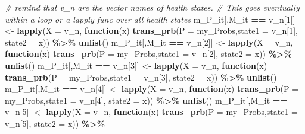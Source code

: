 \documentclass[
]{article}
\newenvironment{Shaded}{\begin{snugshade}}{\end{snugshade}}
\newcommand{\AttributeTok}[1]{\textcolor[rgb]{0.13,0.29,0.53}{#1}}
\newcommand{\CommentTok}[1]{\textcolor[rgb]{0.56,0.35,0.01}{\textit{#1}}}
\newcommand{\ControlFlowTok}[1]{\textcolor[rgb]{0.13,0.29,0.53}{\textbf{#1}}}
\newcommand{\DecValTok}[1]{\textcolor[rgb]{0.00,0.00,0.81}{#1}}
\newcommand{\FunctionTok}[1]{\textcolor[rgb]{0.13,0.29,0.53}{\textbf{#1}}}
\newcommand{\NormalTok}[1]{#1}
\newcommand{\OtherTok}[1]{\textcolor[rgb]{0.56,0.35,0.01}{#1}}
\newcommand{\SpecialCharTok}[1]{\textcolor[rgb]{0.81,0.36,0.00}{\textbf{#1}}}
\begin{document}
\begin{Shaded}
\begin{Highlighting}[]
  \CommentTok{\# remind that v\_n are the vector names of health states.}
  \CommentTok{\# This goes eventually within a loop or a lapply func over all health states}
\NormalTok{  m\_P\_it[,M\_it }\SpecialCharTok{==}\NormalTok{ v\_n[}\DecValTok{1}\NormalTok{]]   }\OtherTok{\textless{}{-}} 
    \FunctionTok{lapply}\NormalTok{(}\AttributeTok{X =}\NormalTok{ v\_n, }\ControlFlowTok{function}\NormalTok{(x) }\FunctionTok{trans\_prb}\NormalTok{(}\AttributeTok{P =}\NormalTok{ my\_Probs,}\AttributeTok{state1 =}\NormalTok{ v\_n[}\DecValTok{1}\NormalTok{], }\AttributeTok{state2 =}\NormalTok{ x)) }\SpecialCharTok{\%\textgreater{}\%} 
    \FunctionTok{unlist}\NormalTok{()}
\NormalTok{  m\_P\_it[,M\_it }\SpecialCharTok{==}\NormalTok{ v\_n[}\DecValTok{2}\NormalTok{]]   }\OtherTok{\textless{}{-}} 
    \FunctionTok{lapply}\NormalTok{(}\AttributeTok{X =}\NormalTok{ v\_n, }\ControlFlowTok{function}\NormalTok{(x) }\FunctionTok{trans\_prb}\NormalTok{(}\AttributeTok{P =}\NormalTok{ my\_Probs,}\AttributeTok{state1 =}\NormalTok{ v\_n[}\DecValTok{2}\NormalTok{], }\AttributeTok{state2 =}\NormalTok{ x)) }\SpecialCharTok{\%\textgreater{}\%} 
    \FunctionTok{unlist}\NormalTok{() }
\NormalTok{  m\_P\_it[,M\_it }\SpecialCharTok{==}\NormalTok{ v\_n[}\DecValTok{3}\NormalTok{]]   }\OtherTok{\textless{}{-}} 
    \FunctionTok{lapply}\NormalTok{(}\AttributeTok{X =}\NormalTok{ v\_n, }\ControlFlowTok{function}\NormalTok{(x) }\FunctionTok{trans\_prb}\NormalTok{(}\AttributeTok{P =}\NormalTok{ my\_Probs,}\AttributeTok{state1 =}\NormalTok{ v\_n[}\DecValTok{3}\NormalTok{], }\AttributeTok{state2 =}\NormalTok{ x)) }\SpecialCharTok{\%\textgreater{}\%} 
    \FunctionTok{unlist}\NormalTok{() }
\NormalTok{  m\_P\_it[,M\_it }\SpecialCharTok{==}\NormalTok{ v\_n[}\DecValTok{4}\NormalTok{]]   }\OtherTok{\textless{}{-}} 
    \FunctionTok{lapply}\NormalTok{(}\AttributeTok{X =}\NormalTok{ v\_n, }\ControlFlowTok{function}\NormalTok{(x) }\FunctionTok{trans\_prb}\NormalTok{(}\AttributeTok{P =}\NormalTok{ my\_Probs,}\AttributeTok{state1 =}\NormalTok{ v\_n[}\DecValTok{4}\NormalTok{], }\AttributeTok{state2 =}\NormalTok{ x)) }\SpecialCharTok{\%\textgreater{}\%} 
    \FunctionTok{unlist}\NormalTok{() }
\NormalTok{  m\_P\_it[,M\_it }\SpecialCharTok{==}\NormalTok{ v\_n[}\DecValTok{5}\NormalTok{]]   }\OtherTok{\textless{}{-}} 
    \FunctionTok{lapply}\NormalTok{(}\AttributeTok{X =}\NormalTok{ v\_n, }\ControlFlowTok{function}\NormalTok{(x) }\FunctionTok{trans\_prb}\NormalTok{(}\AttributeTok{P =}\NormalTok{ my\_Probs,}\AttributeTok{state1 =}\NormalTok{ v\_n[}\DecValTok{5}\NormalTok{], }\AttributeTok{state2 =}\NormalTok{ x)) }\SpecialCharTok{\%\textgreater{}\%} 

\end{Highlighting}
\end{Shaded}
\end{document}
